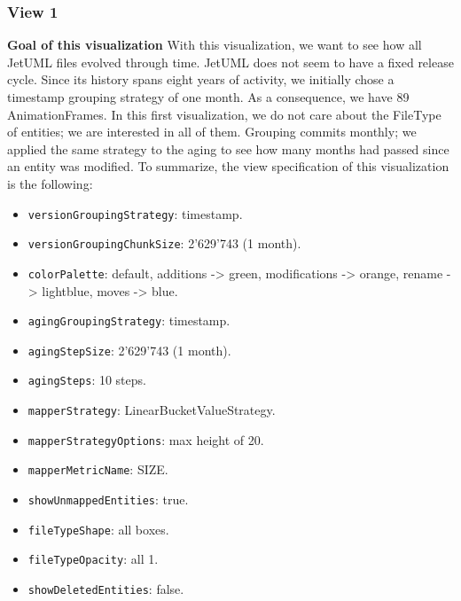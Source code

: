 \newpage
\subsubsection*{View 1}
\textbf{Goal of this visualization}
With this visualization, we want to see how all JetUML files evolved through time. 
JetUML does not seem to have a fixed release cycle.
Since its history spans eight years of activity, we initially chose a timestamp grouping strategy of one month. 
As a consequence, we have 89 AnimationFrames. 
In this first visualization, we do not care about the FileType of entities; we are interested in all of them. 
Grouping commits monthly; we applied the same strategy to the aging to see how many months had passed since an entity was modified. 
To summarize, the view specification of this visualization is the following:
\begin{itemize}
    \item \texttt{versionGroupingStrategy}: timestamp.
    \item \texttt{versionGroupingChunkSize}: 2'629'743 (1 month). 
    \item \texttt{colorPalette}: default, additions -> green, modifications -> orange, rename -> lightblue, moves -> blue.
    \item \texttt{agingGroupingStrategy}: timestamp.
    \item \texttt{agingStepSize}: 2'629'743 (1 month).
    \item \texttt{agingSteps}: 10 steps. 
    \item \texttt{mapperStrategy}: LinearBucketValueStrategy.
    \item \texttt{mapperStrategyOptions}: max height of 20.
    \item \texttt{mapperMetricName}: SIZE. 
    \item \texttt{showUnmappedEntities}: true.
    \item \texttt{fileTypeShape}: all boxes. 
    \item \texttt{fileTypeOpacity}: all 1. 
    \item \texttt{showDeletedEntities}: false.
\end{itemize}

